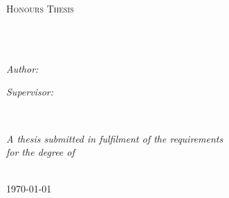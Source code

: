 \documentclass[
12pt, %
oneside, %
english, %
onehalfspacing, %
liststotoc, %
headsepline, %
consistentlayout, %
]{MastersDoctoralThesis} %
\author{Alastair \textsc{Wiegelmann}} %
\begin{document}
\frontmatter %

\pagestyle{plain} %


\begin{titlepage}
\begin{center}

\vspace*{.06\textheight}
{\scshape\LARGE \univname\par}\vspace{1.5cm} %
\textsc{\Large Honours Thesis}\\[0.5cm] %

\HRule \\[0.4cm] %
{\huge \bfseries \ttitle\par}\vspace{0.4cm} %
\HRule \\[1.5cm] %
 
\begin{minipage}[t]{0.4\textwidth}
\begin{flushleft} \large
\emph{Author:}\\
{\authorname} %
\end{flushleft}
\end{minipage}
\begin{minipage}[t]{0.4\textwidth}
\begin{flushright} \large
\emph{Supervisor:} \\
{\supname} %
\end{flushright}
\end{minipage}\\[3cm]
 
\vfill

\large \textit{A thesis submitted in fulfilment of the requirements\\ for the degree of \degreename}\\[0.3cm] %
\deptname\\[2cm] 
\vfill

{\large \today}\\[4cm] %
 
\vfill
\end{center}
\end{titlepage}
\end{document}
